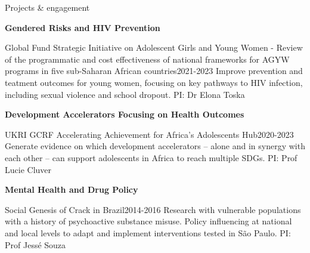 \begin{rSection}{Projects \& engagement}
\begin{etaremune}
\vspace{1em}
\item \textbf{Gendered Risks and HIV Prevention}

\begin{rSubsection}
{Global Fund Strategic Initiative on Adolescent Girls and Young Women - Review of the programmatic and cost effectiveness of national frameworks for AGYW programs in five sub-Saharan African countries}{2021-2023}
{Improve prevention and teatment outcomes for young women, focusing on key pathways to HIV infection, including sexual violence and school dropout. PI: Dr Elona Toska}\par
\end{rSubsection}

\vspace{1em}
\item \textbf{Development Accelerators Focusing on Health Outcomes}\par

\begin{rSubsection}
{UKRI GCRF Accelerating Achievement for Africa's Adolescents Hub}{2020-2023}
{Generate evidence on which development accelerators – alone and in synergy with each other – can support adolescents in Africa to reach multiple SDGs. PI: Prof Lucie Cluver}\par
\end{rSubsection}

\vspace{1em}
\item  \textbf{Mental Health and Drug Policy}\par

\begin{rSubsection}
{Social Genesis of Crack in Brazil}{2014-2016}
{Research with vulnerable populations with a history of psychoactive substance misuse. Policy influencing at national and local levels to adapt and implement interventions tested in São Paulo. PI: Prof Jessé Souza}\par
\end{rSubsection}

\end{etaremune}
\end{rSection}